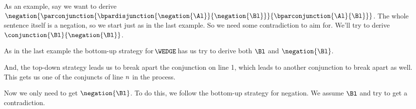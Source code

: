As an example, say we want to derive $\negation{\parconjunction{\bpardisjunction{\negation{\Al}}{\negation{\Bl}}}{\bparconjunction{\Al}{\Bl}}}$. 
The whole sentence itself is a negation, so we start just as in the last example. 
So we need some contradiction to aim for. 
We'll try to derive $\conjunction{\Bl}{\negation{\Bl}}$.
\begin{gproof}
\galineNCnd{}{}{}
\galineNCnd{}{$\qquad\vdots$}{}
\galineNCnd{}{}{}
\end{gproof}
As in the last example the bottom-up strategy for $\!\WEDGE\!$ has us try to derive both $\Bl$ and $\negation{\Bl}$.
\begin{gproof}
\galineNCnd{}{}{}
\galineNCnd{}{$\qquad\vdots$}{}
\galineNCnd{}{}{}
\end{gproof}
And, the top-down strategy leads us to break apart the conjunction on line 1, which leads to another conjunction to break apart as well. This gets us one of the conjuncts of line $n$ in the process.
\begin{gproof}
\galineNCnd{}{}{}
\galineNCnd{}{$\qquad\vdots$}{}
\galineNCnd{}{}{}
\end{gproof}
Now we only need to get $\negation{\Bl}$. 
To do this, we follow the bottom-up strategy for negation. 
We assume $\Bl$ and try to get a contradiction.
\begin{gproof}
\end{gproof}
